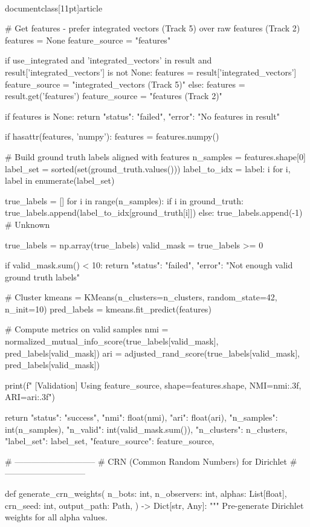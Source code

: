 \\documentclass[11pt]{article}
\begin{document}
\begin{CodeBlock}
    # Get features - prefer integrated vectors (Track 5) over raw features (Track 2)
    features = None
    feature_source = "features"

    if use_integrated and 'integrated_vectors' in result and result['integrated_vectors'] is not None:
        features = result['integrated_vectors']
        feature_source = "integrated_vectors (Track 5)"
    else:
        features = result.get('features')
        feature_source = "features (Track 2)"

    if features is None:
        return {"status": "failed", "error": "No features in result"}

    if hasattr(features, 'numpy'):
        features = features.numpy()

    # Build ground truth labels aligned with features
    n_samples = features.shape[0]
    label_set = sorted(set(ground_truth.values()))
    label_to_idx = {label: i for i, label in enumerate(label_set)}

    true_labels = []
    for i in range(n_samples):
        if i in ground_truth:
            true_labels.append(label_to_idx[ground_truth[i]])
        else:
            true_labels.append(-1)  # Unknown

    true_labels = np.array(true_labels)
    valid_mask = true_labels >= 0

    if valid_mask.sum() < 10:
        return {"status": "failed", "error": "Not enough valid ground truth labels"}

    # Cluster
    kmeans = KMeans(n_clusters=n_clusters, random_state=42, n_init=10)
    pred_labels = kmeans.fit_predict(features)

    # Compute metrics on valid samples
    nmi = normalized_mutual_info_score(true_labels[valid_mask], pred_labels[valid_mask])
    ari = adjusted_rand_score(true_labels[valid_mask], pred_labels[valid_mask])

    print(f"    [Validation] Using {feature_source}, shape={features.shape}, NMI={nmi:.3f}, ARI={ari:.3f}")

    return {
        "status": "success",
        "nmi": float(nmi),
        "ari": float(ari),
        "n_samples": int(n_samples),
        "n_valid": int(valid_mask.sum()),
        "n_clusters": n_clusters,
        "label_set": label_set,
        "feature_source": feature_source,
    }


# -----------------------------
# CRN (Common Random Numbers) for Dirichlet
# -----------------------------

def generate_crn_weights(
    n_bots: int,
    n_observers: int,
    alphas: List[float],
    crn_seed: int,
    output_path: Path,
) -> Dict[str, Any]:
    """
    Pre-generate Dirichlet weights for all alpha values.
    

\end{CodeBlock}
\end{document}
